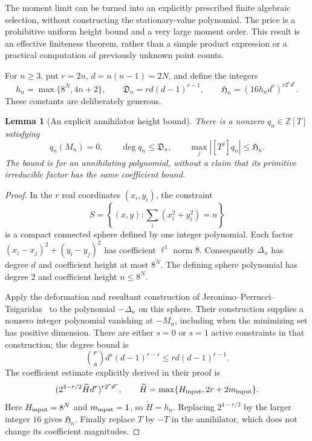 \documentclass[11pt]{article}
\newtheorem{lemma}[theorem]{Lemma}
\theoremstyle{remark}
\numberwithin{equation}{section}
\begin{document}
The moment limit can be turned into an explicitly prescribed finite
algebraic selection, without constructing the stationary-value polynomial.
The price is a prohibitive uniform height bound and a very large moment
order. This result is an effective finiteness theorem, rather than a
simple product expression or a practical computation of previously
unknown point counts.

For $n\ge3$, put $r=2n$, $d=n(n-1)=2N$, and define the integers
\begin{equation}\label{eq:uniform-height-constants}
 h_n=\max\{8^N,4n+2\},\qquad
 \mathfrak{D}_n=rd(d-1)^{r-1},\qquad
 \mathfrak{H}_n=(16h_nd^r)^{r2^rd^r}.
\end{equation}
These constants are deliberately generous.

\begin{lemma}[An explicit annihilator height bound]
\label{lem:uniform-height-bound}
There is a nonzero $q_n\in\mathbb Z[T]$ satisfying
\[
 q_n(M_n)=0,\qquad \deg q_n\le \mathfrak{D}_n,\qquad
 \max_j|[T^j]q_n|\le \mathfrak{H}_n.
\]
The bound is for an annihilating polynomial, without a claim that its
primitive irreducible factor has the same coefficient bound.
\end{lemma}
\begin{proof}
In the $r$ real coordinates $(x_i,y_i)$, the constraint
\[
 S=\left\{(x,y):\sum_i(x_i^2+y_i^2)=n\right\}
\]
is a compact connected sphere defined by one integer polynomial.
Each factor $(x_i-x_j)^2+(y_i-y_j)^2$ has coefficient $\ell^1$ norm $8$.
Consequently $\Delta_n$ has degree $d$ and coefficient height at most
$8^N$. The defining sphere polynomial has degree $2$ and coefficient
height $n\le8^N$.

Apply the deformation and resultant construction of
Jeronimo--Perrucci--Tsigaridas~\cite[Proposition~2.7 and the proof of
Theorem~1.1]{JPT} to the polynomial $-\Delta_n$ on this sphere.
Their construction supplies a nonzero integer polynomial vanishing at
$-M_n$, including when the minimizing set has positive dimension.
There are either $s=0$ or $s=1$ active constraints in that construction;
the degree bound is
\[
 \binom rs d^s(d-1)^{r-s}\le rd(d-1)^{r-1}.
\]
The coefficient estimate explicitly derived in their proof is
\[
 (2^{4-r/2}\widetilde H d^r)^{r2^rd^r},\qquad
 \widetilde H=\max\{H_{\rm input},2r+2m_{\rm input}\}.
\]
Here $H_{\rm input}=8^N$ and $m_{\rm input}=1$, so
$\widetilde H=h_n$. Replacing $2^{4-r/2}$ by the larger integer $16$
gives $\mathfrak{H}_n$. Finally replace $T$ by $-T$ in the annihilator, which
does not change its coefficient magnitudes.
\end{proof}
\end{document}
